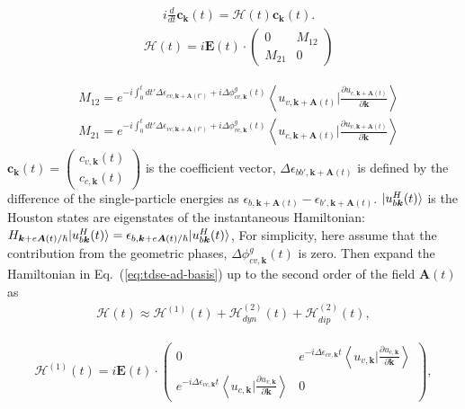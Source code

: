 \begin{align}
&i\frac{d}{dt} \mathbf c_{\mathbf k}(t) = \mathcal{H}(t) \mathbf c_{\mathbf k}(t).
	\label{eq:tdse-ad-basis}
\end{align}
\begin{align}
&\mathcal{H}(t)= 
 i\mathbf E(t)\cdot \left(
    \begin{array}{cc}
        0 & M_{12}\\
        M_{21} & 0
    \end{array}
    \right)
\end{align}

\begin{align}
       & M_{12} = e^{-i\int^t_0dt' \Delta \epsilon_{cv,\mathbf k+ \mathbf A(t')}+i \Delta \phi^g_{cv,\mathbf k}(t)} 
  \left \langle u_{v,\mathbf k+\mathbf A(t)}\Big |\frac{\partial u_{c,\mathbf k+\mathbf A(t)}}{\partial
  \mathbf k} \right \rangle\\ 
       &  M_{21} = e^{-i\int^t_0dt' \Delta \epsilon_{vc,\mathbf k+ \mathbf A(t')}+i \Delta \phi^g_{vc,\mathbf k}(t)} 
  \left \langle u_{c,\mathbf k+\mathbf A(t)}\Big |\frac{\partial u_{v,\mathbf k+\mathbf A(t)}}{\partial
  \mathbf k} \right \rangle
\end{align}
$\mathbf c_{\mathbf k}(t) = \left(
    \begin{array}{cc}
      c_{v,\mathbf k}(t) \\
      c_{c,\mathbf k}(t)
    \end{array}
    \right)$ is the coefficient vector,  $\Delta\epsilon_{bb',\mathbf k+ \mathbf A(t)}$ is defined by the difference of the single-particle energies as $\epsilon_{b,\mathbf k+ \mathbf A(t)}-\epsilon_{b',\mathbf k+ \mathbf A(t)}$. 
$|u^H_{b\boldsymbol k}(t)\rangle $ is the Houston states are eigenstates of the instantaneous Hamiltonian: $H_{\boldsymbol{k}+e\boldsymbol{A}(t)/\hbar} |u^H_{b\boldsymbol k}(t)\rangle = \epsilon_{b,\boldsymbol k + e\boldsymbol A(t)/\hbar}|u^H_{b\boldsymbol k}(t)\rangle$, 
    For simplicity, here assume that the contribution from the geometric phases, $\Delta \phi^g_{cv,\mathbf k}(t)$ is zero. Then expand the Hamiltonian in Eq.~(\ref{eq:tdse-ad-basis}) up to the second order of the field $\mathbf A(t)$ as
\begin{align}
\mathcal{H}(t)\approx \mathcal{H}^{(1)}(t) + \mathcal{H}^{(2)}_{dyn}(t) + \mathcal{H}^{(2)}_{dip}(t),
\end{align}

\begin{align}
\mathcal{H}^{(1)}(t) = i \mathbf E(t)\cdot 
\left(
    \begin{array}{cc}
      0 & 
      e^{-i \Delta \epsilon_{cv,\mathbf k}t} 
  \left \langle u_{v,\mathbf k}\Big |\frac{\partial u_{c,\mathbf k}}{\partial \mathbf k} \right \rangle \\
      e^{-i\Delta \epsilon_{vc,\mathbf k}t}
  \left \langle u_{c,\mathbf k}\Big |\frac{\partial u_{v,\mathbf k}}{\partial \mathbf k} \right \rangle &
      0
    \end{array}
    \right),
\end{align}

